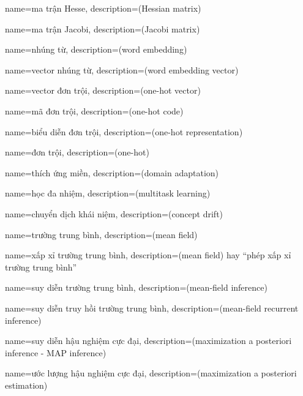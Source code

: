{
    name={ma trận Hesse},
    description={(Hessian matrix)}
}

{
    name={ma trận Jacobi},
    description={(Jacobi matrix)}
}

{
    name={nhúng từ},
    description={(word embedding)}
}

{
    name={vector nhúng từ},
    description={(word embedding vector)}
}

{
    name={vector đơn trội},
    description={(one-hot vector)}
}

{
    name={mã đơn trội},
    description={(one-hot code)}
}

{
    name={biểu diễn đơn trội},
    description={(one-hot representation)}
}

{
    name={đơn trội},
    description={(one-hot)}
}

{
    name={thích ứng miền},
    description={(domain adaptation)}
}

{
    name={học đa nhiệm},
    description={(multitask learning)}
}

{
    name={chuyển dịch khái niệm},
    description={(concept drift)}
}

{
    name={trường trung bình},
    description={(mean field)}
}

{
    name={xấp xỉ trường trung bình},
    description={(mean field) hay ``phép xấp xỉ trường trung bình''}
}

{
    name={suy diễn trường trung bình},
    description={(mean-ﬁeld inference)}
}

{
    name={suy diễn truy hồi trường trung bình},
    description={(mean-ﬁeld recurrent inference)}
}

{
    name={suy diễn hậu nghiệm cực đại},
    description={(maximization a posteriori inference - MAP inference)}
}

{
    name={ước lượng hậu nghiệm cực đại},
    description={(maximization a posteriori estimation)}
}

